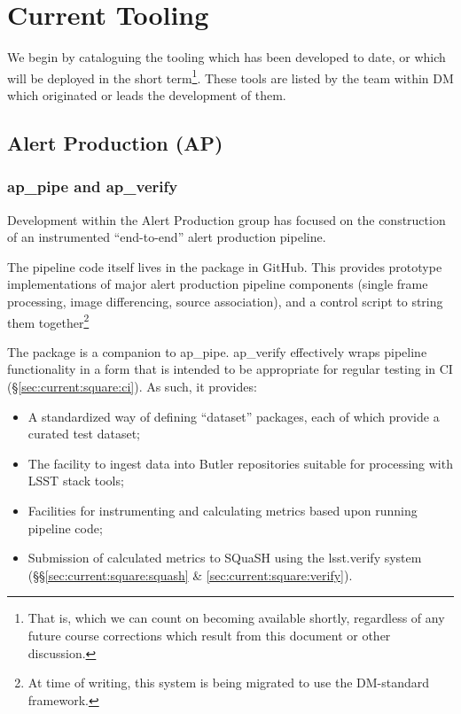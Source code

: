 \documentclass[DM,authoryear,toc,lsstdraft]{lsstdoc}
\begin{document}
\section{Current Tooling}
\label{sec:current}

We begin by cataloguing the tooling which has been developed to date, or which
will be deployed in the short term\footnote{That is, which we can count on
becoming available shortly, regardless of any future course corrections which
result from this document or other discussion.}. These tools are listed by the
team within DM which originated or leads the development of them.

\subsection{Alert Production (AP)}
\label{sec:current:ap}

\subsubsection{ap\_pipe and ap\_verify}

Development within the Alert Production group has focused on the construction
of an instrumented ``end-to-end'' alert production pipeline.

The pipeline code itself lives in the  package in
GitHub. This provides prototype implementations of major alert production
pipeline components (single frame processing, image differencing, source
association), and a control script to string them together\footnote{At time of
writing, this system is being migrated to use the DM-standard
 framework.}

The  package is a companion to ap\_pipe. ap\_verify
effectively wraps pipeline functionality in a form that is intended to be
appropriate for regular testing in CI (\S\ref{sec:current:square:ci}). As
such, it provides:

\begin{itemize}

  \item{A standardized way of defining ``dataset'' packages, each of which
  provide a curated test dataset;}
  \item{The facility to ingest data into Butler repositories suitable for
  processing with LSST stack tools;}
  \item{Facilities for instrumenting and calculating metrics based upon
  running pipeline code;}
  \item{Submission of calculated metrics to SQuaSH using the lsst.verify
  system (\S\S\ref{sec:current:square:squash} \&
  \ref{sec:current:square:verify}).}

\end{itemize}
\end{document}
